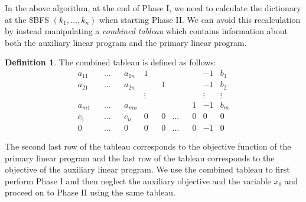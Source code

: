 \documentclass[
]{book}
\theoremstyle{definition}
\newtheorem{definition}{Definition}[chapter]
\theoremstyle{definition}
\theoremstyle{definition}
\theoremstyle{definition}
\theoremstyle{remark}
\begin{document}
In the above algorithm, at the end of Phase I, we need to calculate the dictionary at the \$BFS \((k_1, \dots, k_n)\) when starting Phase II. We can avoid this recalculation by instead manipulating a \emph{combined tableau} which contains information about both the auxiliary linear program and the primary linear program.

\begin{definition}
The combined tableau is defined as follows:
\begin{equation*}
  \begin{array}{rrrrrrrrrrrr|l}
      a_{11}  & & \dots & & a_{1n}  & 1 & & & & & & -1 &b_1\\
      a_{21}  & & \dots & & a_{2n}  & & & 1 & & & & -1 &b_2\\
      & & & & & \vdots & & & & & & \vdots & \vdots \\
      a_{m1}  & & \dots & & a_{mn}  & & & & & & 1 & -1 &b_m\\ \hline
      c_1  & & \dots & & c_{n}  & 0 & & 0 & \dots & & 0 & 0 & 0\\ \hline
      0  & & \dots & & 0  & 0 & & 0 & \dots & & 0 & -1 & 0
  \end{array} 
\end{equation*}
\end{definition}

The second last row of the tableau corresponds to the objective function of the primary linear program and the last row of the tableau corresponds to the objective of the auxiliary linear program. We use the combined tableau to first perform Phase I and then neglect the auxiliary objective and the variable \(x_0\) and proceed on to Phase II using the same tableau.
\end{document}
